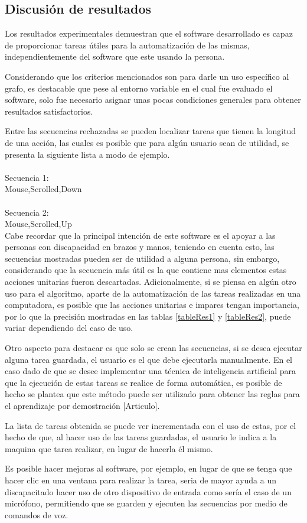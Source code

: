 \subsection{Discusi\'{o}n de resultados}


Los resultados experimentales demuestran que el software desarrollado es capaz de proporcionar tareas \'utiles para la automatizaci\'on de las mismas, independientemente del software que este usando la persona.


Considerando que los criterios mencionados son para darle un uso espec\'ifico al grafo, es destacable que pese al entorno variable en el cual fue evaluado el software, solo fue necesario asignar unas pocas condiciones generales para obtener resultados satisfactorios. 


Entre las secuencias rechazadas se pueden localizar tareas que tienen la longitud de una acci\'on, las cuales es posible que para alg\'un usuario sean de utilidad, se presenta la siguiente lista a modo de ejemplo.
\\
\\
Secuencia 1:\\
Mouse,Scrolled,Down\\
\\
Secuencia 2:\\
Mouse,Scrolled,Up\\

Cabe recordar que la principal intenci\'on de este software es el apoyar a las personas con discapacidad en brazos y manos, teniendo en cuenta esto, las secuencias mostradas pueden ser de utilidad a alguna persona, sin embargo, considerando que la secuencia m\'as \'util es la que contiene mas elementos estas acciones unitarias fueron descartadas. Adicionalmente, si se piensa en alg\'un otro uso para el algoritmo, aparte de la automatizaci\'on de las tareas realizadas en una computadora, es posible que las acciones unitarias e impares tengan importancia, por lo que la precisi\'on mostradas en las tablas \ref{tableRes1} y \ref{tableRes2}, puede variar dependiendo del caso de uso.


Otro aspecto para destacar es que solo se crean las secuencias, si se desea ejecutar alguna tarea guardada, el usuario es el que debe ejecutarla manualmente. En el caso dado de que se desee implementar una t\'ecnica de inteligencia artificial para que la ejecuci\'on de estas tareas se realice de forma autom\'atica, es posible de hecho se plantea que este m\'etodo puede ser utilizado para obtener las reglas para el aprendizaje por demostraci\'on [Articulo].   


La lista de tareas obtenida se puede ver incrementada con el uso de estas, por el hecho de que, al hacer uso de las tareas guardadas, el usuario le indica a la maquina que tarea realizar, en lugar de hacerla \'el mismo. 


Es posible hacer mejoras al software, por ejemplo, en lugar de que se tenga que hacer clic en una ventana para realizar la tarea, seria de mayor ayuda a un discapacitado hacer uso de otro dispositivo de entrada como ser\'ia el caso de un micr\'ofono, permitiendo que se guarden y ejecuten las secuencias por medio de comandos de voz. 
